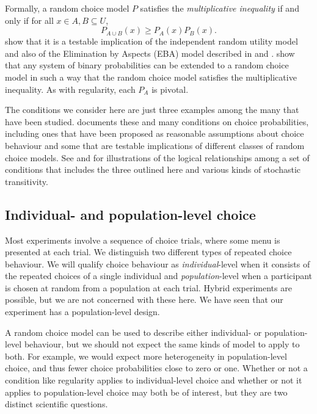\documentclass[11pt,letter]{article}
\newcommand{\menu}{menu}
\newcommand{\univ}{U}
\begin{document}
Formally, a random choice model $P$ satisfies the {\em multiplicative inequality} if and only if for all $x \in A, B \subseteq \univ$,
\[
  P_{A \cup B}(x) \geq P_A(x) P_B(x).
\]
\citet{SattTver76} show that it is a testable implication of the independent random utility model and also of the Elimination by Aspects (EBA) model described in \citet{Tver72b} and \citet{Tver72a}.
\citet{McCaMarl24} show that any system of binary probabilities can be extended to a random choice model in such a way that the random choice model satisfies the multiplicative inequality.
As with regularity, each $P_A$ is pivotal.

The conditions we consider here are just three examples among the many that have been studied.
\citet{Fish99} documents these and many conditions on choice probabilities, including ones that have been proposed as reasonable assumptions about choice behaviour and some that are testable implications of different classes of random choice models.
See \citet{LuceSupp65} and \citet{McCaMarl13} for illustrations of the logical relationships among a set of conditions that includes the three outlined here and various kinds of stochastic transitivity.

\subsection{Individual- and population-level choice}\label{s:aggregation}

Most experiments involve a sequence of choice trials, where some \menu{} is presented at each trial.
We distinguish two different types of repeated choice behaviour.
We will qualify choice behaviour as {\em individual}-level when it consists of the repeated choices of a single individual and {\em population}-level when a participant is chosen at random from a population at each trial.
Hybrid experiments are possible, but we are not concerned with these here.
We have seen that our experiment has a population-level design.

A random choice model can be used to describe either individual- or population-level behaviour, but we should not expect the same kinds of model to apply to both.
For example, we would expect more heterogeneity in population-level choice, and thus fewer choice probabilities close to zero or one.
Whether or not a condition like regularity applies to individual-level choice and whether or not it applies to  population-level choice may both be of interest, but they are two distinct scientific questions.
\end{document}
